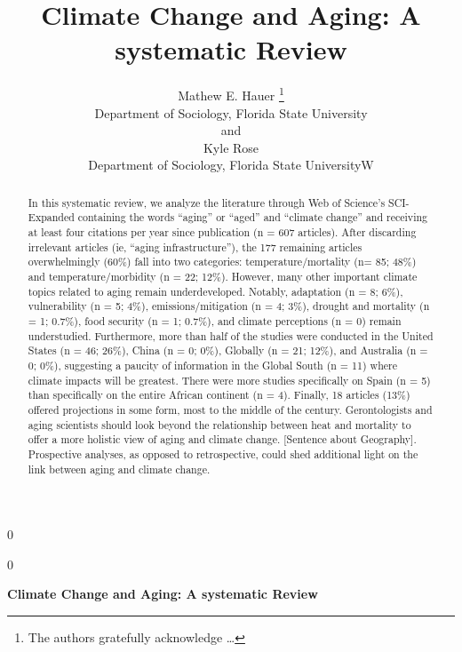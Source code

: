\documentclass[12pt]{article}
\newcommand{\blind}{0}
\begin{document}
\def\spacingset#1{\renewcommand{\baselinestretch}%
{#1}\small\normalsize} \spacingset{1}



\blind
{
  \title{\bf Climate Change and Aging: A systematic Review}

  \author{
        Mathew E. Hauer \thanks{The authors gratefully acknowledge
\ldots{}} \\
    Department of Sociology, Florida State University\\
     and \\     Kyle Rose \\
    Department of Sociology, Florida State UniversityW\\
      }
  \maketitle
} \fi

\blind
{
  \bigskip
  \bigskip
  \bigskip
  \begin{center}
    {\LARGE\bf Climate Change and Aging: A systematic Review}
  \end{center}
  \medskip
} \fi

\bigskip
\begin{abstract}
In this systematic review, we analyze the literature through Web of
Science's SCI-Expanded containing the words ``aging'' or ``aged'' and
``climate change'' and receiving at least four citations per year since
publication (n = 607 articles). After discarding irrelevant articles
(ie, ``aging infrastructure''), the 177 remaining articles
overwhelmingly (60\%) fall into two categories: temperature/mortality
(n= 85; 48\%) and temperature/morbidity (n = 22; 12\%). However, many
other important climate topics related to aging remain underdeveloped.
Notably, adaptation (n = 8; 6\%), vulnerability (n = 5; 4\%),
emissions/mitigation (n = 4; 3\%), drought and mortality (n = 1; 0.7\%),
food security (n = 1; 0.7\%), and climate perceptions (n = 0) remain
understudied. Furthermore, more than half of the studies were conducted
in the United States (n = 46; 26\%), China (n = 0; 0\%), Globally (n =
21; 12\%), and Australia (n = 0; 0\%), suggesting a paucity of
information in the Global South (n = 11) where climate impacts will be
greatest. There were more studies specifically on Spain (n = 5) than
specifically on the entire African continent (n = 4). Finally, 18
articles (13\%) offered projections in some form, most to the middle of
the century. Gerontologists and aging scientists should look beyond the
relationship between heat and mortality to offer a more holistic view of
aging and climate change. {[}Sentence about Geography{]}. Prospective
analyses, as opposed to retrospective, could shed additional light on
the link between aging and climate change.
\end{abstract}
\end{document}
